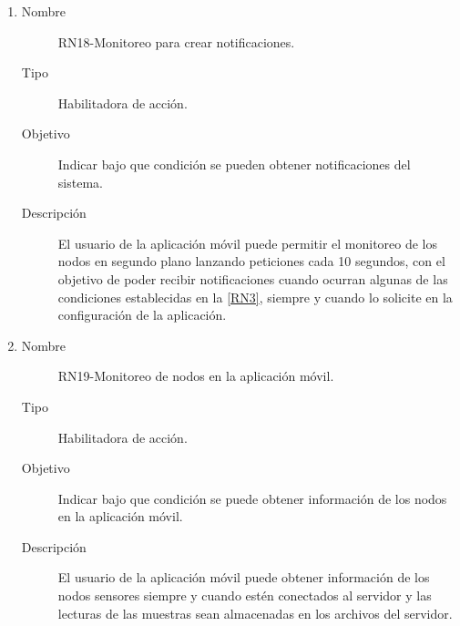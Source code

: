 \begin{enumerate}[label=RN\arabic*.]
\item \label{RN18}
		\begin{description}
			\item[Nombre] RN18-Monitoreo para crear notificaciones.
			\item[Tipo] Habilitadora de acción.
			\item[Objetivo] Indicar bajo que condición se pueden obtener notificaciones del sistema.
			\item[Descripción] El usuario de la aplicación móvil puede permitir el monitoreo de los nodos en segundo plano lanzando peticiones cada 10 segundos, con el objetivo de poder recibir notificaciones cuando ocurran algunas de las condiciones establecidas en la \ref{RN3}, siempre y cuando lo solicite en la configuración de la aplicación.
		\end{description}
\item \label{RN19}
		\begin{description}
			\item[Nombre] RN19-Monitoreo de nodos en la aplicación móvil.
			\item[Tipo] Habilitadora de acción.
			\item[Objetivo] Indicar bajo que condición se puede obtener información de los nodos en la aplicación móvil.
			\item[Descripción] El usuario de la aplicación móvil puede obtener información de los nodos sensores siempre y cuando estén conectados al servidor y las lecturas de las muestras sean almacenadas en los archivos del servidor.
		\end{description}
		

\end{enumerate}
